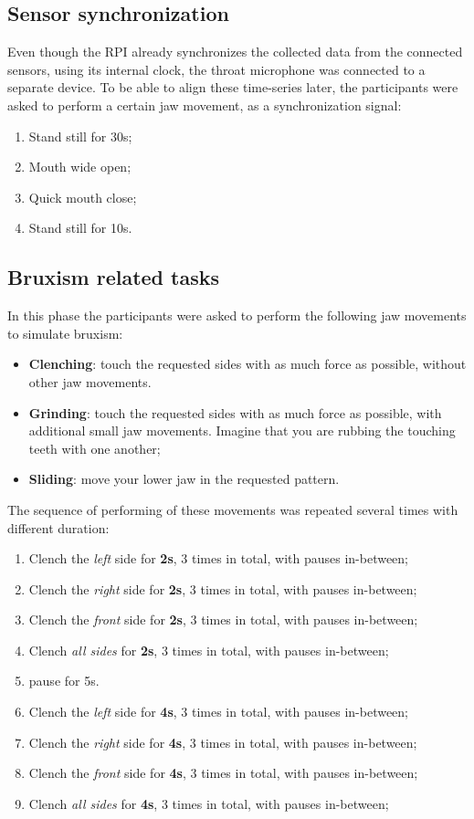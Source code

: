 \subsection{Sensor synchronization}
Even though the RPI already synchronizes the collected data from the connected sensors, using its internal clock, the throat microphone was connected to a separate device. To be able to align these time-series later, the participants were asked to perform a certain jaw movement, as a synchronization signal:
\begin{enumerate}
    \item Stand still for 30s;
    \item Mouth wide open;
    \item Quick mouth close;
    \item Stand still for 10s.
\end{enumerate}

\subsection{Bruxism related tasks}
In this phase the participants were asked to perform the following jaw movements to simulate bruxism:
\begin{itemize}
    \item \textbf{Clenching}: touch the requested sides with as much force as possible, without other jaw movements.
    \item \textbf{Grinding}: touch the requested sides with as much force as possible, with additional small jaw movements. Imagine that you are rubbing the touching teeth with one another;
    \item \textbf{Sliding}: move your lower jaw in the requested pattern.
\end{itemize}

The sequence of performing of these movements was repeated several times with different duration:
\begin{enumerate}
    \item Clench the \emph{left} side for \textbf{2s}, 3 times in total, with pauses in-between;
    \item Clench the \emph{right} side for \textbf{2s}, 3 times in total, with pauses in-between;
    \item Clench the \emph{front} side for \textbf{2s}, 3 times in total, with pauses in-between;
    \item Clench \emph{all sides} for \textbf{2s}, 3 times in total, with pauses in-between;
    \item pause for 5s.
    \item Clench the \emph{left} side for \textbf{4s}, 3 times in total, with pauses in-between;
    \item Clench the \emph{right} side for \textbf{4s}, 3 times in total, with pauses in-between;
    \item Clench the \emph{front} side for \textbf{4s}, 3 times in total, with pauses in-between;
    \item Clench \emph{all sides} for \textbf{4s}, 3 times in total, with pauses in-between;
\end{enumerate}


